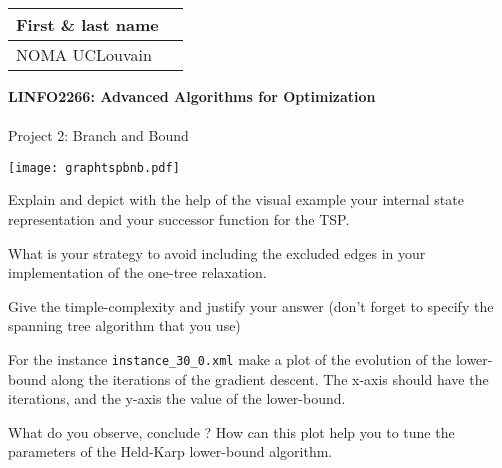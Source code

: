 \documentclass[12pt]{report}
\newcommand{\answerbox}[2]{\hfill\break\\
        \framebox[\linewidth]{\parbox[c][#1][c]{\dimexpr\linewidth-2\fboxsep-2\fboxrule}{#2}}
}
\begin{document}
\hfill
\begingroup
\Large
\begin{tabular}{|l|p{6cm}|}
	\hline
	First \& last name &
	\\ \hline
	NOMA UCLouvain & 
	\\ \hline
\end{tabular}
\endgroup
\vspace{1.5cm}

\noindent
\begingroup
	\Large
	\textbf{LINFO2266: Advanced Algorithms for Optimization}\\\\
	Project 2: Branch and Bound
\endgroup
\vspace{0.2cm}

\begin{Exercise}[title={Modeling the Traveling Salesman Problem}]


\texttt{[image: graphtspbnb.pdf]}

\Question Explain and depict with the help of the visual example your internal state representation and your successor function for the TSP.
\answerbox{10cm}{
}


\end{Exercise}





\pagebreak

\begin{Exercise}[title={One-tree lower-bound}]

\Question What is your strategy to avoid including the excluded edges in your implementation
of the one-tree relaxation.
\answerbox{10cm}{
}


\Question Give the timple-complexity and justify your answer (don't forget to specify the spanning tree algorithm that you use)
\answerbox{6cm}{
}


\end{Exercise}

\pagebreak


\begin{Exercise}[title={Held and Karp lower-bound}]

\Question For the instance \verb|instance_30_0.xml| make a plot of the evolution of the lower-bound along the iterations of the gradient descent. The x-axis should have the iterations, and the y-axis the value of the lower-bound.
\answerbox{12cm}{
}


\Question What do you observe, conclude ? How can this plot help you to tune the parameters of the Held-Karp lower-bound algorithm.
\answerbox{6cm}{
}


\end{Exercise}
\end{document}
